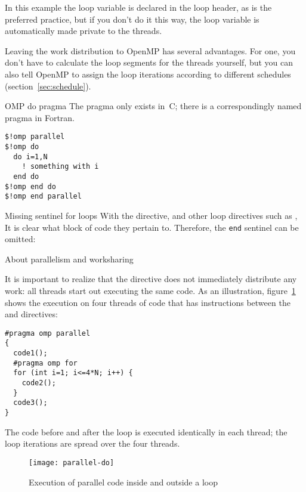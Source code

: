 \begin{remark}
  In this example the loop variable is declared in the loop header,
  as is the preferred practice, but if you don't do it this way,
  the loop variable is automatically made private to the threads.
\end{remark}

Leaving the work distribution to OpenMP has several advantages.
For one, you don't have to calculate the loop segments
for the threads yourself, but you can also tell OpenMP to assign the loop
iterations according to different schedules (section~\ref{sec:schedule}).

\begin{fortrannote}{OMP do pragma}
  The  pragma only exists in~C;
  there is a correspondingly named  pragma in Fortran.
\begin{lstlisting}
$!omp parallel
$!omp do
  do i=1,N
    ! something with i
  end do
$!omp end do
$!omp end parallel
\end{lstlisting}
\end{fortrannote}

\begin{fortrannote}{Missing sentinel for loops}
  With the  directive,
  and other loop directives such as ,
  It is clear what block of code they pertain to.
  Therefore, the \lstinline[language=omp]{end} sentinel can be omitted:
\end{fortrannote}

 {About parallelism and worksharing}

It is important to realize that the 
directive does not immediately distribute any work:
all threads start out executing the same code.
As an illustration, 
figure~\ref{fig:omp-par-do} shows the execution on four threads of
code that has instructions between the 
and  directives:

\begin{lstlisting}[language=omp]
#pragma omp parallel
{
  code1();
  #pragma omp for
  for (int i=1; i<=4*N; i++) {
    code2();
  }
  code3();
}
\end{lstlisting}

The code before and after the loop is executed identically
in each thread; the loop iterations are spread over the four threads.
\begin{figure}[ht]
  \texttt{[image: parallel-do]}
  \caption{Execution of parallel code inside and outside a loop}
  \label{fig:omp-par-do}
\end{figure}


